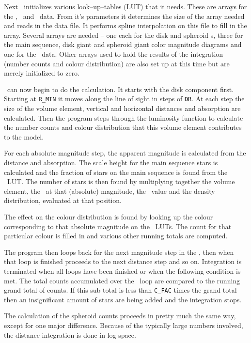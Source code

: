 \documentclass[11pt,twoside]{article}
\begin{document}
Next \bsm\ initializes various look--up--tables (LUT) that it needs. These are
arrays for the \lf, \cmd\ and \fms\ data. From it's parameters it determines
the size of the array needed and reads in the data file. It performs
spline interpolation on this file to fill in the array. Several arrays are
needed -- one each for the disk and spheroid \lf s, three for the main
sequence, disk giant and spheroid giant color magnitude diagrams and one
for the \fms\ data. Other arrays used to hold the results of the
integration (number counts and colour distribution) are also set up at this
time but are merely initialized to zero.

\bsm\ can now begin to do the calculation. It starts with the disk component
first. Starting at {\tt R\_MIN} it moves along the line of sight in steps of 
{\tt DR}. At each step the size of the volume element, vertical and horizontal
distances and absorption are calculated. Then the program steps through 
the luminosity function to calculate the number counts and colour 
distribution that this volume element contributes to the model. 

For each absolute magnitude step, the apparent magnitude is calculated 
from the distance and absorption. The scale height for the main sequence 
stars is calculated and the fraction of stars on the main sequence is
found from the \fms\ LUT. The number of stars is then found by multiplying
together the volume element, the \lf\ at that (absolute) magnitude, the
\fms\ value and the density distribution, evaluated at that position.

The effect on the colour distribution is found by looking up the colour
corresponding to that absolute magnitude on the \cmd\ LUTs. The count
for that particular colour is filled in and various other running totals
are computed.

The program then loops back for the next magnitude step in the \lf, then
when that loop is finished proceeds to the next distance step and so on.
Integration is terminated when all loops have been finished or when
the following condition is met. The total counts accumulated over the
\lf\ loop are compared to the running grand total of counts. If this 
sub total is less than {\tt C\_FAC} times the grand total then an insignificant
amount of stars are being added and the integration stops.

The calculation of the spheroid counts proceeds in pretty much the same way,
except for one major difference. Because of the typically large numbers
involved, the distance integration is done in log space.
\end{document}

